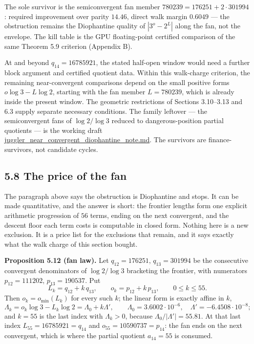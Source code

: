 \documentclass[12pt]{article}
\begin{document}
The sole survivor is the semiconvergent fan member
\(780239=176251+2\cdot 301994\): required improvement over parity
\(14.46\), direct walk margin \(0.6049\) --- the obstruction remains the
Diophantine quality of \(|3^o-2^L|\) along the fan, not the envelope.
The kill table is the GPU floating-point certified comparison of the
same Theorem 5.9 criterion (Appendix B).

At and beyond \(q_{14}=16785921\), the stated half-open window would
need a further block argument and certified quotient data. Within this
walk-charge criterion, the remaining near-convergent comparisons depend
on the small positive forms \(o\log3-L\log2\), starting with the fan
member \(L=780239\), which is already inside the present window. The
geometric restrictions of Sections 3.10--3.13 and 6.3 supply separate
necessary conditions. The family leftover --- the semiconvergent fans of
\(\log 2/\log 3\) reduced to dangerous-position partial quotients --- is
the working draft \url{juggler_near_convergent_diophantine_note.md}. The
survivors are finance-survivors, not candidate cycles.

\subsection{5.8 The price of the fan}\label{the-price-of-the-fan}

The paragraph above says the obstruction is Diophantine and stops. It
can be made quantitative, and the answer is short: the frontier lengths
form one explicit arithmetic progression of \(56\) terms, ending on the
next convergent, and the descent floor each term costs is computable in
closed form. Nothing here is a new exclusion. It is a price list for the
exclusions that remain, and it says exactly what the walk charge of this
section bought.

\textbf{Proposition 5.12 (fan law).} Let \(q_{12}=176251\),
\(q_{13}=301994\) be the consecutive convergent denominators of
\(\log 2/\log 3\) bracketing the frontier, with numerators
\(p_{12}=111202\), \(p_{13}=190537\). Put \[
L_k=q_{12}+k\,q_{13},\qquad o_k=p_{12}+k\,p_{13},\qquad 0\le k\le 55 .
\] Then \(o_k=o_{\min}(L_k)\) for every such \(k\); the linear form is
exactly affine in \(k\), \[
\Lambda_k=o_k\log 3-L_k\log 2=\Lambda_0+k\Lambda',
\qquad
\Lambda_0=3.6002\cdot10^{-6},
\quad
\Lambda'=-6.4508\cdot10^{-8};
\] and \(k=55\) is the last index with \(\Lambda_k>0\), because
\(\Lambda_0/\lvert\Lambda'\rvert=55.81\). At that last index
\(L_{55}=16785921=q_{14}\) and \(o_{55}=10590737=p_{14}\): the fan ends
on the next convergent, which is where the partial quotient
\(a_{14}=55\) is consumed.
\end{document}
